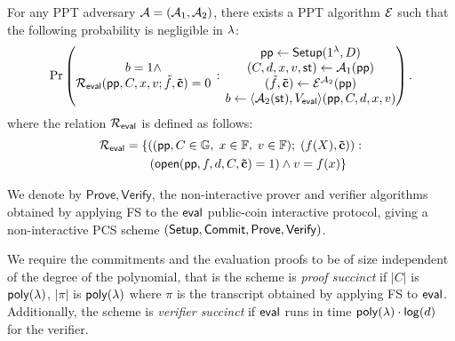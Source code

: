 \begin{definition}[Extractability]
\label{def:pcs-ext-app}
For any PPT adversary $\mathcal{A} = (\mathcal{A}_{1},\mathcal{A}_{2})$, there exists a PPT algorithm $\mathcal{E}$ such that the following probability is negligible in $\lambda$:
	 \[
    \Pr\left(
      \begin{matrix}
      b = 1 \wedge \\
      \mathcal{R}_{\mathsf{eval}}(\mathsf{pp},C,x,v; \tilde{f},\mathbf{\tilde{c}}) = 0
      \end{matrix}
      \,:\,
      \begin{matrix}
         \mathsf{pp} \leftarrow \mathsf{Setup}(1^{\lambda},D) \\
          (C,d,x,v,\mathsf{st}) \leftarrow \mathcal{A}_{1}(\mathsf{pp}) \\
         (\tilde{f},\mathbf{\tilde{c}}) \leftarrow \mathcal{E}^{\mathcal{A}_{2}}(\mathsf{pp})\\
         b \leftarrow \langle \mathcal{A}_{2}(\mathsf{st}), V_{\mathsf{eval}} \rangle(\mathsf{pp},C,d,x,v)
      \end{matrix}
    \right).
  \]
  where the relation $\mathcal{R}_{\mathsf{eval}}$ is defined as follows:
\begin{align*}
        \mathcal{R}_{\mathsf{eval}} &= \{\left((\mathsf{pp},C \in \mathbb{G},\; x \in \mathbb{F}, \; v \in \mathbb{F});\; (f(X), \mathbf{\tilde{c}}) \right) : \\
        &\qquad (
        \mathsf{open}(\mathsf{pp},f,d,C,\mathbf{\tilde{c}}) = 1 )
         \land v = f(x)  \}
    \end{align*} 
    
\end{definition}

We denote by $\mathsf{Prove}, \mathsf{Verify}$, the non-interactive prover and verifier algorithms obtained by applying FS to the 
$\mathsf{eval}$ public-coin interactive protocol, giving a non-interactive PCS scheme $(\mathsf{Setup},\mathsf{Commit},\allowbreak \mathsf{Prove},\mathsf{Verify})$.

\begin{definition}[Succinctness]
\label{def:pcs-succinct}
We require the commitments and the evaluation proofs to be of size independent of the degree of the polynomial, that is the scheme is \emph{proof succinct} if
$|C|$ is $\mathsf{poly}(\lambda)$, $|\pi|$ is $\mathsf{poly}(\lambda)$ where $\pi$ is the transcript obtained by applying FS to $\mathsf{eval}$. Additionally, the scheme is \emph{verifier succinct} if $\mathsf{eval}$ runs in time
$\mathsf{poly}(\lambda) \cdot \allowbreak \mathsf{log} (d)$ for the verifier.
\end{definition}


